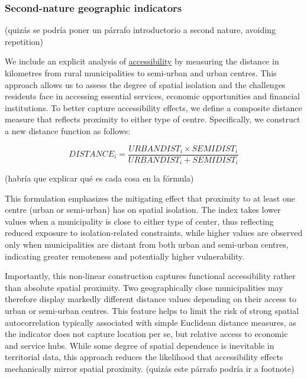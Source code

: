 \documentclass[a4paper,11pt,oneside]{article}
\begin{document}
\subsubsection{Second-nature geographic indicators}
\label{sec:geographic_distance_variables}

{\color{red} (quizás se podría poner un párrafo introductorio a second nature, avoiding repetition)}

We include an explicit analysis of \underline{accessibility} by measuring the distance in kilometres from rural municipalities to semi-urban and urban centres. This approach allows us to assess the degree of spatial isolation and the challenges residents face in accessing essential services, economic opportunities and financial institutions. To better capture accessibility effects, we define a composite distance measure that reflects proximity to either type of centre. Specifically, we construct a new distance function as follows:

\begin{equation}
\label{eq:eq9}
DISTANCE_i = \frac{URBANDIST_i \times SEMIDIST_i}{URBANDIST_i + SEMIDIST_i}
\end{equation}

{\color{red} (habría que explicar qué es cada cosa en la fórmula)}

This formulation emphasizes the mitigating effect that proximity to at least one centre (urban or semi-urban) has on spatial isolation. The index takes lower values when a municipality is close to either type of center, thus reflecting reduced exposure to isolation-related constraints, while higher values are observed only when municipalities are distant from both urban and semi-urban centres, indicating greater remoteness and potentially higher vulnerability.

Importantly, this non-linear construction captures functional accessibility rather than absolute spatial proximity. Two geographically close municipalities may therefore display markedly different distance values depending on their access to urban or semi-urban centres. This feature helps to limit the risk of strong spatial autocorrelation typically associated with simple Euclidean distance measures, as the indicator does not capture location per se, but relative access to economic and service hubs. While some degree of spatial dependence is inevitable in territorial data, this approach reduces the likelihood that accessibility effects mechanically mirror spatial proximity. {\color{red} (quizás este párrafo podría ir a footnote)}
\end{document}
